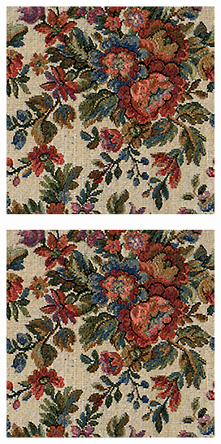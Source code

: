 \begin{figure}[]
\begin{subfigure}{\textwidth}
        \begin{subfigure}{0.24\textwidth}
            \centering
            \includegraphics[width=\textwidth]{images/04-experiment01/flowers/target.jpg}
            \caption*{}
        \end{subfigure}
        \hfill
        \begin{subfigure}{0.24\textwidth}
            \centering
            \includegraphics[width=\textwidth]{images/04-experiment01/flowers/flowers_bg.jpg}

\end{subfigure}
\end{subfigure}
\end{figure}
